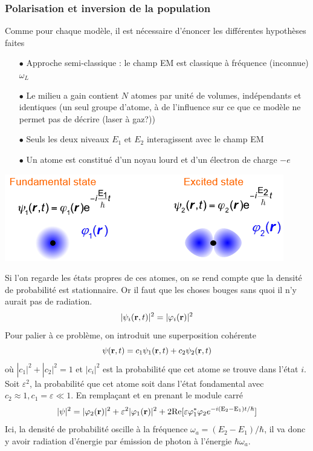 \subsubsection{Polarisation et inversion de la population}
Comme pour chaque modèle, il est nécessaire d'énoncer les différentes hypothèses faites
\begin{itemize}
\item[$\bullet$] Approche semi-classique : le champ EM est classique à fréquence (inconnue) $\omega_L$
\item[$\bullet$] Le milieu a gain contient $N$ atomes par unité de volumes, indépendants et identiques (un seul groupe d'atome, à de l'influence sur ce que ce modèle ne permet pas de décrire (laser à gaz?))
\item[$\bullet$] Seuls les deux niveaux $E_1$ et $E_2$ interagissent avec le champ EM
\item[$\bullet$] Un atome est constitué d'un noyau lourd et d'un électron de charge $-e$
\end{itemize}
\begin{center}
	\includegraphics[scale=0.65]{ch3/image7.png}
\end{center}
Si l'on regarde les états propres de ces atomes, on se rend compte que la densité de probabilité
est stationnaire. Or il faut que les choses bouges sans quoi il n'y aurait pas de radiation.
\begin{equation}
|{\psi _i}({\bf{r}},t){|^2} = |{\varphi _i}({\bf{r}}){|^2}
\end{equation}
Pour palier à ce problème, on introduit une superposition cohérente
\begin{equation}
\psi ({\bf{r}},t) = {c_1}{\psi _1}({\bf{r}},t) + {c_2}{\psi _2}({\bf{r}},t)
\end{equation}
où $|{c_1}{|^2} + |{c_2}{|^2} = 1$ et $|c_i|^2$ est la probabilité que cet atome se trouve dans 
l'état $i$. Soit $\varepsilon^2$, la probabilité que cet atome soit dans l'état fondamental avec 
$c_2\approx1, c_1=\varepsilon\ll 1$. En remplaçant et en prenant le module carré
\begin{equation}
|\psi {|^2} = |{\varphi _2}({\bf{r}}){|^2} + {\varepsilon ^2}|{\varphi _1}({\bf{r}}){|^2} + 2{\rm{Re[}}\varepsilon \varphi _1^*{\varphi _2}{e^{ - i({{\rm{E}}_2} - {{\rm{E}}_1})t/\hbar }}]
\end{equation}
Ici, la densité de probabilité oscille à la fréquence $\omega_a = (E_2-E_1)/\hbar$, il va donc 
y avoir radiation d'énergie par émission de photon à l'énergie $\hbar\omega_a$.\\

